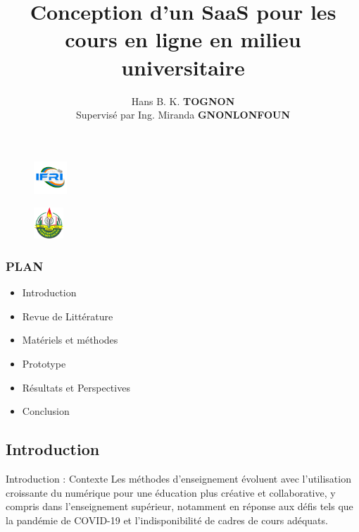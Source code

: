 \documentclass{beamer}
\title{Conception d'un SaaS pour les cours en ligne en milieu universitaire}
\author[Hans TOGNON]{Hans B. K. \textbf{TOGNON} \\ Supervisé par Ing. Miranda \textbf{GNONLONFOUN}}
\institute[IFRI]{
\textbf{I}nstitut de \textbf{F}ormation et de \textbf{R}echerche en  \textbf{I}nformatique \\
\medskip
}
\begin{document}
\begin{frame}
  \thispagestyle{empty}
  \begin{multicols}{2}
    \begin{figure}
        \flushleft
        \includegraphics[width=0.11\textwidth]{logoifri}
    \end{figure}
    \begin{figure}
        \flushright
        \includegraphics[width=0.1\textwidth]{logouac}
    \end{figure}
    \end{multicols}
    \vspace{-1cm}
  \titlepage
  \end{frame}

\begin{frame}
  \frametitle{PLAN}
  \begin{itemize}
    \item Introduction
    \item Revue de Littérature
    \item Matériels et méthodes
    \item Prototype
    \item Résultats et Perspectives
    \item Conclusion
  \end{itemize}
\end{frame}

\begin{frame}
  \begin{center}
    \section{\huge{Introduction}}
  \end{center}
\end{frame}

\begin{frame}{Introduction : \small{Contexte}}
  Les méthodes d'enseignement évoluent avec l'utilisation croissante 
  du numérique pour une éducation plus créative et collaborative, y 
  compris dans l'enseignement supérieur, notamment en réponse aux défis 
  tels que la pandémie de COVID-19 et l'indisponibilité de cadres de cours 
  adéquats.
\end{frame}
\end{document}
